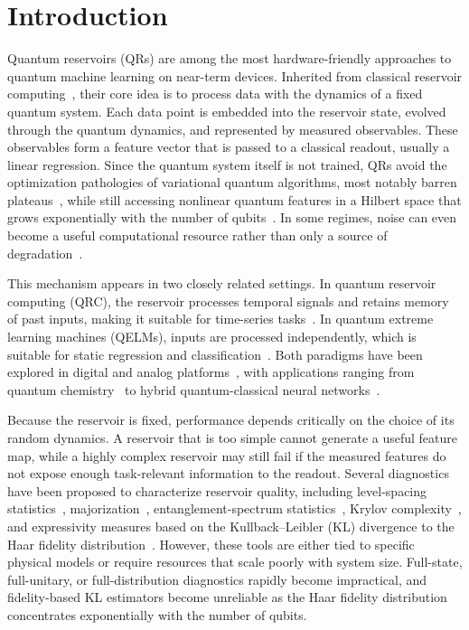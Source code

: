 \documentclass[
    aps,
    pre,
    amsmath,
    amssymb,
    reprint,
    superscriptaddress,
    preprintnumbers,
]{revtex4-2}
\begin{document}
\section{Introduction}

Quantum reservoirs (QRs) are among the most hardware-friendly approaches to quantum machine learning on near-term devices. Inherited from classical reservoir computing~\cite{jaeger2004harnessing,
maass2004computational, tanaka2019recent, nakajima2020physical}, their core idea is to process data with the dynamics of a fixed quantum system. Each data point is embedded into the reservoir state, evolved through the quantum dynamics, and represented by measured observables. These observables form a feature vector that is passed to a classical readout, usually a linear regression. Since the quantum system itself is not trained, QRs avoid the optimization pathologies of variational quantum algorithms, most notably barren plateaus~\cite{mcclean2018barren, cerezo2021cost,
larocca2024review, anschuetz2022traps, thanasilp2023subtleties}, while still accessing nonlinear quantum features in a Hilbert space that grows exponentially with the number of qubits~\cite{fujii2017harnessing, mujal2021opportunities}. In some regimes, noise can even become a useful computational resource rather than only a source of degradation~\cite{DomingoSciRep2023NoiseQRC, sannia2024engineered}.

This mechanism appears in two closely related settings. In quantum reservoir computing (QRC), the reservoir processes temporal signals and retains memory of past inputs, making it suitable for time-series tasks~\cite{chen2020temporal, kobayashi2024feedback,
hou2026experimental}. In quantum extreme learning machines (QELMs), inputs are processed independently, which is suitable for static regression and classification~\cite{xiong2024fundamental}. Both paradigms have been explored in digital and analog platforms~\cite{senanian2024microwave, nokkala2021gaussian,
govia2021single}, with applications ranging from quantum chemistry~\cite{domingo2022optimal, quantumchemQRC} to hybrid quantum-classical neural networks~\cite{BindingAffinities}.

Because the reservoir is fixed, performance depends critically on the choice of its random dynamics. A reservoir that is too simple cannot generate a useful feature map, while a highly complex reservoir may still fail if the measured features do not expose enough task-relevant information to the readout. Several diagnostics have been proposed to characterize reservoir quality, including level-spacing statistics~\cite{martinezpena2021dynamical}, majorization~\cite{latorre2002majorization,
vallejos2021majorization}, entanglement-spectrum statistics~\cite{shaffer2014entanglement}, Krylov complexity~\cite{domingo2024krylov}, and expressivity measures based on the Kullback--Leibler (KL) divergence to the Haar fidelity distribution~\cite{expressibility}. However, these tools are either tied to specific physical models or require resources that scale poorly with system size. Full-state, full-unitary, or full-distribution diagnostics rapidly become impractical, and fidelity-based KL estimators become unreliable as the Haar fidelity distribution concentrates exponentially with the number of qubits.
\end{document}
